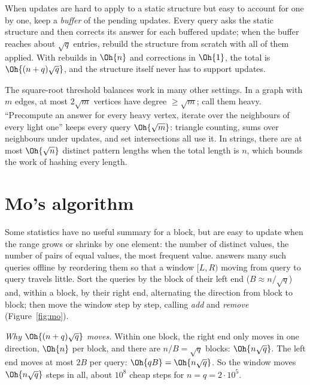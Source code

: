 \begin{trick}
When updates are hard to apply to a static structure but easy to account for one by one, keep a \emph{buffer} of the pending updates.
Every query asks the static structure and then corrects its answer for each buffered update; when the buffer reaches about $\sqrt q$
entries, rebuild the structure from scratch with all of them applied. With rebuilds in $\Oh{n}$ and corrections in $\Oh{1}$, the total is
$\Oh{(n + q)\sqrt q}$, and the structure itself never has to support updates.
\end{trick}

\begin{trick}
The square-root threshold balances work in many other settings. In a graph with $m$ edges, at most $2\sqrt m$ vertices have degree
$\ge \sqrt m$; call them heavy. ``Precompute an answer for every heavy vertex, iterate over the neighbours of every light one'' keeps
every query $\Oh{\sqrt m}$: triangle counting, sums over neighbours under updates, and set intersections all use it. In strings, there
are at most $\Oh{\sqrt n}$ distinct pattern lengths when the total length is $n$, which bounds the work of hashing every length.
\end{trick}

\section[Mo's algorithm]{Mo's algorithm \hfill \plat}\label{sec:mo}

Some statistics have no useful summary for a block, but are easy to update when the range grows or shrinks by one element: the
number of distinct values, the number of pairs of equal values, the most frequent value.  answers many such
queries offline by reordering them so that a window $[L, R)$ moving from query to query travels little. Sort the queries by the block
of their left end ($B \approx n / \sqrt q$) and, within a block, by their right end, alternating the direction from block to block;
then move the window step by step, calling \emph{add} and \emph{remove} (Figure~\ref{fig:mo}).

\emph{Why $\Oh{(n + q)\sqrt q}$ moves.} Within one block, the right end only moves in one direction, $\Oh{n}$ per block, and there are
$n / B = \sqrt q$ blocks: $\Oh{n \sqrt q}$. The left end moves at most $2B$ per query: $\Oh{qB} = \Oh{n \sqrt q}$. So the window moves
$\Oh{n \sqrt q}$ steps in all, about $10^8$ cheap steps for $n = q = 2 \cdot 10^5$.

